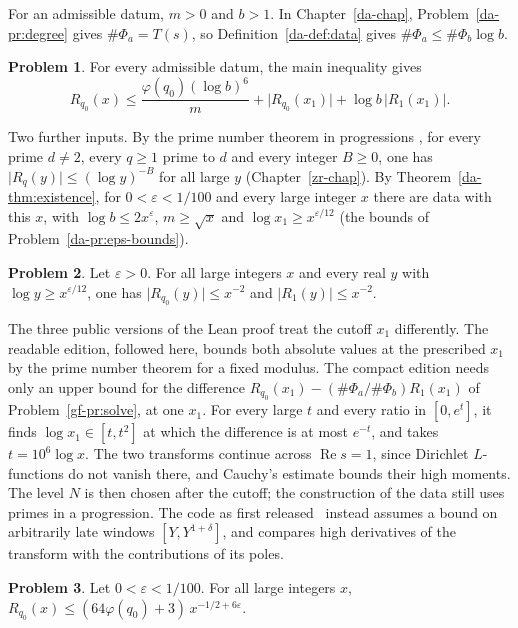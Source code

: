 \documentclass[reqno]{amsart}
\newcounter{chap}
\theoremstyle{definition}
\newtheorem{problem}{Problem}[section]
\theoremstyle{plain}
\begin{document}
For an admissible datum, \(m > 0\) and \(b > 1\).  In Chapter~\ref{da-chap}, Problem~\ref{da-pr:degree} gives \(\#\Phi_a = T(s)\), so Definition~\ref{da-def:data} gives \(\#\Phi_a \le \#\Phi_b \log b\).

\begin{problem}\label{pr:Rx}
For every admissible datum, the main inequality gives
\[
  R_{q_0}(x) \le \frac{\varphi(q_0)(\log b)^6}{m} + \lvert R_{q_0}(x_1)\rvert + \log b\,\lvert R_1(x_1)\rvert .
\]
\end{problem}

Two further inputs.  By the prime number theorem in progressions \cite{MV}, for every prime \(d \ne 2\), every \(q \ge 1\) prime to \(d\) and every integer \(B \ge 0\), one has \(\lvert R_q(y) \rvert \le (\log y)^{-B}\) for all large \(y\) (Chapter~\ref{zr-chap}).  By Theorem~\ref{da-thm:existence}, for \(0 < \varepsilon < 1/100\) and every large integer \(x\) there are data with this \(x\), with \(\log b \le 2x^\varepsilon\), \(m \ge \sqrt x\) and \(\log x_1 \ge x^{\varepsilon/12}\) (the bounds of Problem~\ref{da-pr:eps-bounds}).

\begin{problem}\label{pr:PNT}
Let \(\varepsilon > 0\).  For all large integers \(x\) and every real \(y\) with \(\log y \ge x^{\varepsilon/12}\), one has \(\lvert R_{q_0}(y) \rvert \le x^{-2}\) and \(\lvert R_1(y) \rvert \le x^{-2}\).
\end{problem}

The three public versions of the Lean proof treat the cutoff \(x_1\) differently.  The readable edition, followed here, bounds both absolute values at the prescribed \(x_1\) by the prime number theorem for a fixed modulus.  The compact edition needs only an upper bound for the difference \(R_{q_0}(x_1) - (\#\Phi_a/\#\Phi_b) R_1(x_1)\) of Problem~\ref{gf-pr:solve}, at one \(x_1\).  For every large \(t\) and every ratio in \([0,e^t]\), it finds \(\log x_1 \in [t,t^2]\) at which the difference is at most \(e^{-t}\), and takes \(t = 10^6\log x\).  The two transforms continue across \(\operatorname{Re} s = 1\), since Dirichlet \(L\)-functions do not vanish there, and Cauchy's estimate bounds their high moments.  The level \(N\) is then chosen after the cutoff; the construction of the data still uses primes in a progression.  The code as first released~\cite{Rel} instead assumes a bound on arbitrarily late windows \([Y,Y^{1+\delta}]\), and compares high derivatives of the transform with the contributions of its poles.

\begin{problem}\label{pr:integers}
Let \(0 < \varepsilon < 1/100\).  For all large integers \(x\), \(R_{q_0}(x) \le (64\varphi(q_0) + 3)\, x^{-1/2 + 6\varepsilon}\).
\end{problem}
\end{document}
